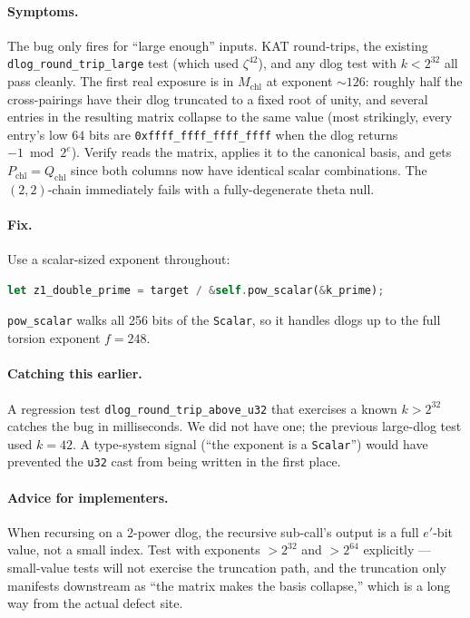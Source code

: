 \paragraph{Symptoms.}  The bug only fires for ``large enough''
inputs.  KAT round-trips, the existing
\texttt{dlog\_round\_trip\_large} test (which used $\zeta^{42}$),
and any dlog test with $k < 2^{32}$ all pass cleanly.  The first
real exposure is in $M_{\mathrm{chl}}$ at exponent $\sim 126$:
roughly half the cross-pairings have their dlog truncated to a
fixed root of unity, and several entries in the resulting matrix
collapse to the same value (most strikingly, every entry's low
$64$ bits are \texttt{0xffff\_ffff\_ffff\_ffff} when the dlog
returns $-1 \bmod 2^e$).  Verify reads the matrix, applies it to
the canonical basis, and gets $P_{\mathrm{chl}} = Q_{\mathrm{chl}}$
since both columns now have identical scalar combinations.  The
$(2,2)$-chain immediately fails with a fully-degenerate theta null.

\paragraph{Fix.}  Use a scalar-sized exponent throughout:
\begin{lstlisting}[language=Rust]
let z1_double_prime = target / &self.pow_scalar(&k_prime);
\end{lstlisting}
\texttt{pow\_scalar} walks all 256 bits of the \texttt{Scalar}, so
it handles dlogs up to the full torsion exponent $f = 248$.

\paragraph{Catching this earlier.}  A regression test
\texttt{dlog\_round\_trip\_above\_u32} that exercises a known
$k > 2^{32}$ catches the bug in milliseconds.  We did not have one;
the previous large-dlog test used $k = 42$.  A type-system signal
(``the exponent is a \texttt{Scalar}'') would have prevented the
\texttt{u32} cast from being written in the first place.

\paragraph{Advice for implementers.}  When recursing on a 2-power
dlog, the recursive sub-call's output is a full $e'$-bit value, not
a small index.  Test with exponents $> 2^{32}$ and $> 2^{64}$
explicitly — small-value tests will not exercise the truncation
path, and the truncation only manifests downstream as ``the matrix
makes the basis collapse,'' which is a long way from the actual
defect site.

